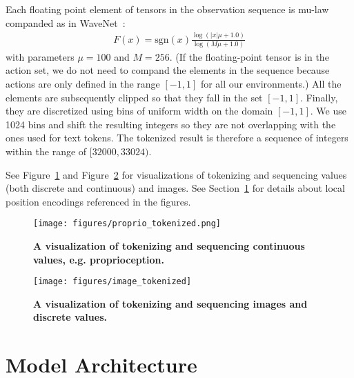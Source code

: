\documentclass[10pt]{article} \usepackage[accepted]{tmlr}
\begin{document}
Each floating point element of tensors in the observation sequence is mu-law companded as in WaveNet~\citep{oord2016wavenet}:
\begin{align}
    F(x) = \text{sgn}(x) \frac{\log(|x|\mu + 1.0)}{\log(M\mu + 1.0)}
\end{align}
with parameters $\mu = 100$ and $M = 256$.
(If the floating-point tensor is in the action set, we do not need to compand the elements in the sequence because actions are only defined in the range $[-1, 1]$ for all our environments.)
All the elements are subsequently clipped so that they fall in the set $[-1, 1]$. Finally, they are discretized using bins of uniform width on the domain $[-1, 1]$. We use 1024 bins and shift the resulting integers so they are not overlapping with the ones used for text tokens. The tokenized result is therefore a sequence of integers within the range of $[32000, 33024)$.


See Figure~\ref{fig:proprio_tokenization} and Figure~\ref{fig:image_tokenization} for visualizations of tokenizing and sequencing values (both discrete and continuous) and images.
See Section~\ref{app:model_arch} for details about local position encodings referenced in the figures.

\begin{figure}
    \centering
    \texttt{[image: figures/proprio\_tokenized.png]} \caption{{\bf A visualization of tokenizing and sequencing continuous values, e.g. proprioception.}
    \label{fig:proprio_tokenization}}
\end{figure}

\begin{figure}
    \centering
    \texttt{[image: figures/image\_tokenized]} \caption{{\bf A visualization of tokenizing and sequencing images and discrete values.}
    \label{fig:image_tokenization}}
\end{figure}

\newpage
\section{Model Architecture}
\label{app:model_arch}
\end{document}

